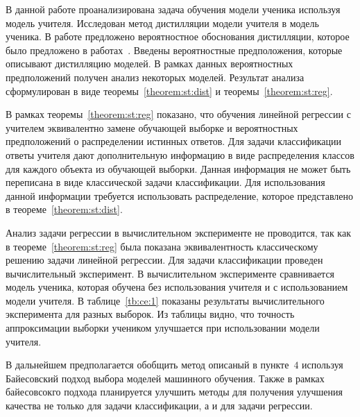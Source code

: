 \documentclass[12pt, twoside]{article}
\begin{document}
В данной работе проанализирована задача обучения модели ученика используя модель учителя.
Исследован метод дистилляции модели учителя в модель ученика.
В работе предложено вероятностное обоснования дистилляции, которое было предложено в работах~\cite{Hinton2015, Lopez2016}.
Введены вероятностные предположения, которые описывают дистилляцию моделей.
В рамках данных вероятностных предположений получен анализ некоторых моделей. Результат анализа сформулирован в виде теоремы~\ref{theorem:st:dist} и теоремы~\ref{theorem:st:reg}.

В рамках теоремы~\ref{theorem:st:reg} показано, что обучения линейной регрессии с учителем эквивалентно замене обучающей выборке и вероятностных предположений о распределении истинных ответов. Для задачи классификации ответы учителя дают дополнительную информацию в виде распределения классов для каждого объекта из обучающей выборки. Данная информация не может быть переписана в виде классической задачи классификации. Для использования данной информации требуется использовать распределение, которое представлено в теореме~\ref{theorem:st:dist}.

Анализ задачи регрессии в вычислительном эксперименте не проводится, так как в теореме~\ref{theorem:st:reg} была показана эквивалентность классическому решению задачи линейной регрессии. Для задачи классификации проведен вычислительный эксперимент. В вычислительном эксперименте сравнивается модель ученика, которая обучена без использования учителя и с использованием модели учителя. В таблице~\ref{tb:ce:1} показаны результаты вычислительного эксперимента для разных выборок. Из таблицы видно, что точность аппроксимации выборки учеником улучшается при использовании модели учителя.

В дальнейшем предполагается обобщить метод описаный в пункте~$4$ используя Байесовский подход выбора моделей машинного обучения. Также в рамках байесовсокго подхода планируется улучшить методы для получения улучшения качества не только для задачи классификации, а и для задачи регрессии.
\end{document}
